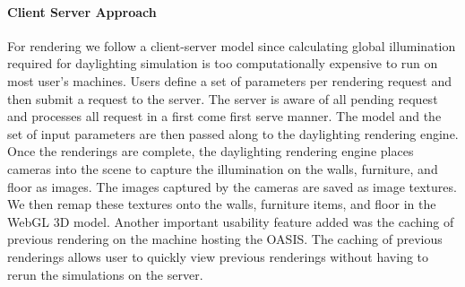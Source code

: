 	\paragraph{Client Server Approach}
	For rendering we follow a client-server model since calculating global illumination required for daylighting simulation is too computationally expensive to run on most user's machines.
	Users define a set of parameters per rendering request and then submit a request to the server.
	The server is aware of all pending request and processes all request in a first come first serve manner.
	The model and the set of input parameters are then passed along to the daylighting rendering engine.
	Once the renderings are complete, the daylighting rendering engine places cameras into the scene to capture the illumination on the walls, furniture, and floor as images.
	The images captured by the cameras are saved as image textures.
	We then remap these textures onto the walls, furniture items, and floor in the WebGL 3D model.
	Another important usability feature added was the caching of previous rendering on the machine hosting the OASIS.
	The caching of previous renderings allows user to quickly view previous renderings without having to rerun the simulations on the server.




